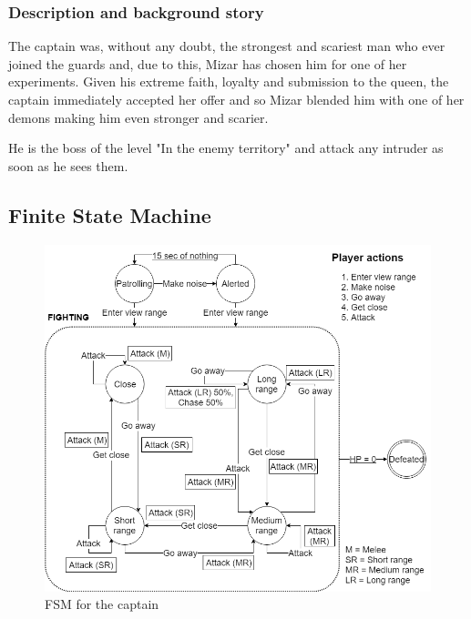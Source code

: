 \subsubsection{Description and background story}
The captain was, without any doubt, the strongest and scariest man who ever joined the guards and, due to this, Mizar has chosen him for one of her experiments. Given his extreme faith, loyalty and submission to the queen, the captain immediately accepted her offer and so Mizar blended him with one of her demons making him even stronger and scarier.

He is the boss of the level "In the enemy territory" and attack any intruder as soon as he sees them.

\subsection{Finite State Machine}
\begin{figure}[H]
  \centering
  \includegraphics[width=\textwidth]{Images/Diagrams/FSMs/captainFSM}
  \caption{FSM for the captain}
\end{figure}

